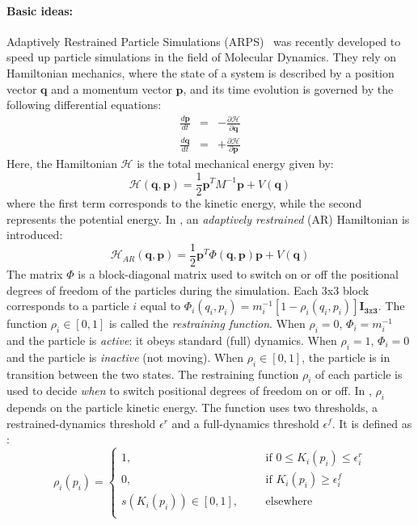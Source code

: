 \documentclass[11pt, oneside, a4paper]{memoir}
\renewcommand{\vec}[1]{\mathbf{#1}}
\newcommand{\vp}{\vec p}
\newcommand{\vq}{\vec q}
\renewcommand{\H}{\mathcal{H}}
\begin{document}
\paragraph*{Basic ideas:}
Adaptively Restrained Particle Simulations (ARPS)~\cite{Artemova2012} was recently developed to speed up particle simulations in the field of Molecular Dynamics.
They rely on Hamiltonian mechanics, where the state of a system is described by a position vector $\vec q$ and a momentum vector $\vec p$, and its time evolution is governed by the following differential equations:
\begin{eqnarray*}
\frac{d\vp}{dt} &=& -\frac{\partial \H}{\partial \vq} \\
\frac{d\vq}{dt} &=& +\frac{\partial \H}{\partial \vp}
\end{eqnarray*}
Here, the Hamiltonian $\H$ is the total mechanical energy given by:
\begin{equation}
    \label{eq:hamiltonian}
    \H(\vq,\vp) = \frac{1}{2} \vp^{T}M^{-1}\vp + V(\vq)
\end{equation}
where the first term corresponds to the kinetic energy, while the second represents the potential energy.
In \cite{Artemova2012}, an \textit{adaptively restrained} (AR) Hamiltonian is introduced:
\begin{equation}
    \label{eq:arhamiltonian}
    \H_{AR}(\vq, \vp) = \frac{1}{2} \vp^{T}\Phi(\vq,\vp)\vp + V(\vq)
\end{equation}
The matrix $\Phi$ is a block-diagonal matrix used to switch on or off the positional degrees of freedom of the particles during the simulation.
Each $3$x$3$ block corresponds to a particle $i$ equal to
$\Phi_{i}(q_{i}, p_{i}) = m_{i}^{-1}[1 - \rho_{i}(q_{i}, p_{i})]\mathbf{I_{3\mathtt{x}3}}$.
The function $\rho_{i} \in [0, 1]$ is called the \emph{restraining function}.
When $\rho_{i} = 0$, $\Phi_{i} = m_{i}^{-1}$ and the particle is \textit{active}: it obeys standard (full) dynamics.
When $\rho_{i} = 1$, $\Phi_{i} = 0$ and the particle is \textit{inactive} (not moving). When $\rho_{i} \in [0, 1]$, the particle is in transition between the two states.
The restraining function $\rho_{i}$ of each particle is used to decide \emph{when} to switch positional degrees of freedom on or off.
In \cite{Artemova2012}, $\rho_{i}$ depends on the particle kinetic energy.
The function uses two thresholds, a restrained-dynamics threshold $\epsilon^{r}$ and a full-dynamics threshold $\epsilon^{f}$.
It is defined as :
\begin{equation}
    \label{eq:restrainingfunction}
    \rho_{i}(p_{i}) =
    \displaystyle\left\lbrace
    \begin{array}{lccc}
        1, & & & \textrm{if } 0 \leq K_{i}(p_{i}) \leq \epsilon_{i}^{r} \\
        0, & & & \textrm{if } K_{i}(p_{i}) \geq \epsilon_{i}^{f} \\
        s(K_{i}(p_{i})) \in [0, 1], & & & \textrm{elsewhere} \\
    \end{array}
    \right.
\end{equation}
\end{document}
